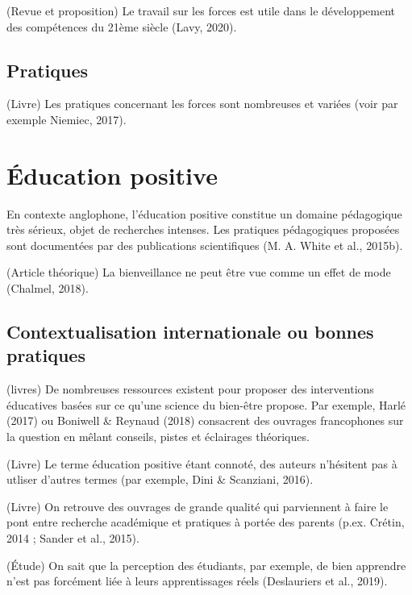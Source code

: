 \documentclass[
  french,
]{article}
\begin{document}
(Revue et proposition) Le travail sur les forces est utile dans le développement des compétences du 21ème siècle (Lavy, 2020).

\hypertarget{pratiques-1}{%
\subsection{Pratiques}\label{pratiques-1}}

(Livre) Les pratiques concernant les forces sont nombreuses et variées (voir par exemple Niemiec, 2017).

\hypertarget{uxe9ducation-positive}{%
\section{Éducation positive}\label{uxe9ducation-positive}}

En contexte anglophone, l'éducation positive constitue un domaine pédagogique très sérieux, objet de recherches intenses. Les pratiques pédagogiques proposées sont documentées par des publications scientifiques (M. A. White et al., 2015b).

(Article théorique) La bienveillance ne peut être vue comme un effet de mode (Chalmel, 2018).

\hypertarget{contextualisation-internationale-ou-bonnes-pratiques}{%
\subsection{Contextualisation internationale ou bonnes pratiques}\label{contextualisation-internationale-ou-bonnes-pratiques}}

(livres) De nombreuses ressources existent pour proposer des interventions éducatives basées sur ce qu'une science du bien-être propose. Par exemple, Harlé (2017) ou Boniwell \& Reynaud (2018) consacrent des ouvrages francophones sur la question en mêlant conseils, pistes et éclairages théoriques.

(Livre) Le terme éducation positive étant connoté, des auteurs n'hésitent pas à utliser d'autres termes (par exemple, Dini \& Scanziani, 2016).

(Livre) On retrouve des ouvrages de grande qualité qui parviennent à faire le pont entre recherche académique et pratiques à portée des parents (p.ex. Crétin, 2014 ; Sander et al., 2015).

(Étude) On sait que la perception des étudiants, par exemple, de bien apprendre n'est pas forcément liée à leurs apprentissages réels (Deslauriers et al., 2019).
\end{document}

